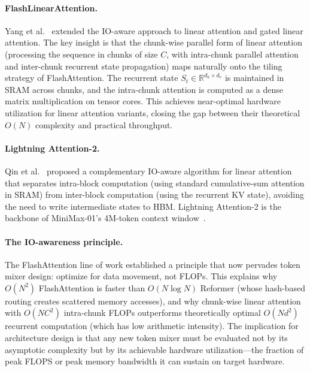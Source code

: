 \paragraph{FlashLinearAttention.}
Yang et al.~\cite{yang2024gla} extended the IO-aware approach to linear attention and gated linear attention. The key insight is that the chunk-wise parallel form of linear attention (processing the sequence in chunks of size $C$, with intra-chunk parallel attention and inter-chunk recurrent state propagation) maps naturally onto the tiling strategy of FlashAttention. The recurrent state $S_t \in \mathbb{R}^{d_k \times d_v}$ is maintained in SRAM across chunks, and the intra-chunk attention is computed as a dense matrix multiplication on tensor cores. This achieves near-optimal hardware utilization for linear attention variants, closing the gap between their theoretical $O(N)$ complexity and practical throughput.

\paragraph{Lightning Attention-2.}
Qin et al.~\cite{qin2024lightning} proposed a complementary IO-aware algorithm for linear attention that separates intra-block computation (using standard cumulative-sum attention in SRAM) from inter-block computation (using the recurrent KV state), avoiding the need to write intermediate states to HBM. Lightning Attention-2 is the backbone of MiniMax-01's 4M-token context window~\cite{minimax2025}.

\paragraph{The IO-awareness principle.}
The FlashAttention line of work established a principle that now pervades token mixer design: optimize for data movement, not FLOPs. This explains why $O(N^2)$ FlashAttention is faster than $O(N \log N)$ Reformer (whose hash-based routing creates scattered memory accesses), and why chunk-wise linear attention with $O(NC^2)$ intra-chunk FLOPs outperforms theoretically optimal $O(Nd^2)$ recurrent computation (which has low arithmetic intensity). The implication for architecture design is that any new token mixer must be evaluated not by its asymptotic complexity but by its achievable hardware utilization---the fraction of peak FLOPS or peak memory bandwidth it can sustain on target hardware.



